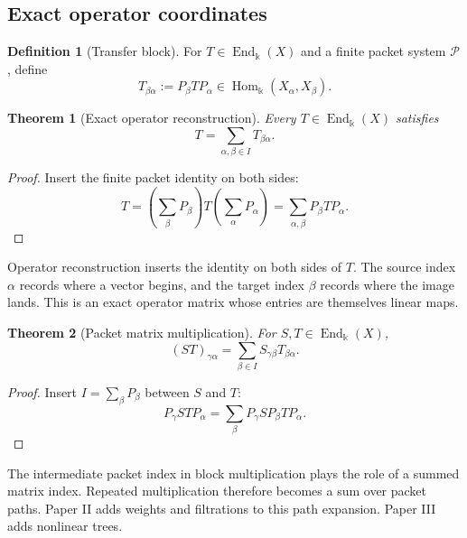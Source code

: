 \documentclass[11pt]{article}
\newtheorem{theorem}{Theorem}[section]
\theoremstyle{definition}
\newtheorem{definition}[definition]{Definition}
\theoremstyle{remark}
\theoremstyle{definition}\newtheorem{example}[theorem]{Example}
\newcommand{\bbk}{\Bbbk}
\newcommand{\Pcal}{\mathcal P}
\newcommand{\End}{\operatorname{End}}
\newcommand{\Hom}{\operatorname{Hom}}
\newcommand{\RecordID}[1]{\label{record:#1}}
\newcommand{\Depends}[1]{}
\newcommand{\Exports}[1]{}
\begin{document}
\subsection{Exact operator coordinates}

\begin{definition}[Transfer block]
\label{def:transfer-block}
For $T\in\End_{\bbk}(X)$ and a finite packet system $\Pcal$, define
\[
T_{\beta\alpha}:=P_\beta TP_\alpha
\in\Hom_{\bbk}(X_\alpha,X_\beta).
\]
\end{definition}
\RecordID{PSC-I-D-TRANSFER-BLOCK}

\begin{theorem}[Exact operator reconstruction]
\label{thm:operator-reconstruction}
Every $T\in\End_{\bbk}(X)$ satisfies
\[
\boxed{T=\sum_{\alpha,\beta\in I}T_{\beta\alpha}.}
\]
\end{theorem}
\RecordID{PSC-I-T-OPERATOR-RECONSTRUCTION}
\Depends{PSC-I-T-EXACT-PACKET-COORDINATES.}

\begin{proof}
Insert the finite packet identity on both sides:
\[
T=
\left(\sum_\beta P_\beta\right)
T
\left(\sum_\alpha P_\alpha\right)
=
\sum_{\alpha,\beta}P_\beta TP_\alpha.
\]
\end{proof}

\begin{interpretation}
Operator reconstruction inserts the identity on both sides of \(T\).  The source index \(\alpha\) records where a vector begins, and the target index \(\beta\) records where the image lands.  This is an exact operator matrix whose entries are themselves linear maps.
\end{interpretation}


\begin{theorem}[Packet matrix multiplication]
\label{thm:block-multiplication}
For $S,T\in\End_{\bbk}(X)$,
\[
\boxed{
(ST)_{\gamma\alpha}
=
\sum_{\beta\in I}S_{\gamma\beta}T_{\beta\alpha}.
}
\]
\end{theorem}
\RecordID{PSC-I-T-BLOCK-MULTIPLICATION}
\Depends{PSC-I-D-PACKET-SYSTEM and PSC-I-D-TRANSFER-BLOCK.}
\Exports{All packet path expansions.}

\begin{proof}
Insert $I=\sum_\beta P_\beta$ between $S$ and $T$:
\[
P_\gamma STP_\alpha
=
\sum_\beta
P_\gamma SP_\beta TP_\alpha.
\]
\end{proof}

\begin{keyidea}
The intermediate packet index in block multiplication plays the role of a summed matrix index.  Repeated multiplication therefore becomes a sum over packet paths.  Paper II adds weights and filtrations to this path expansion.  Paper III adds nonlinear trees.
\end{keyidea}
\end{document}
